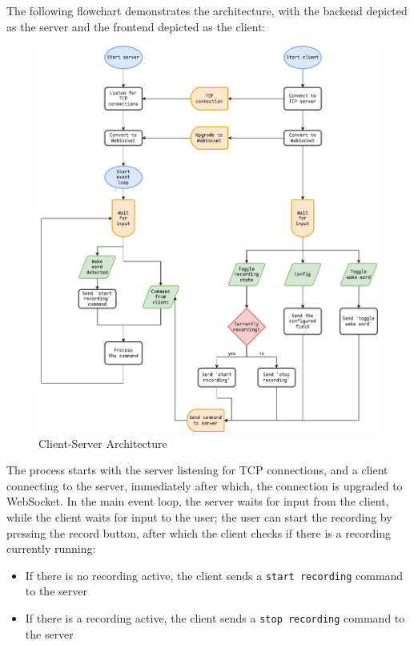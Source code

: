 The following flowchart demonstrates the architecture, with the backend depicted as the server and the frontend depicted as the client:
\begin{figure}[H]
\centering
\includegraphics[width=\textwidth]{assets/architecture}
\caption{Client-Server Architecture}
\label{chart:architecture}
\end{figure}

The process starts with the server listening for TCP connections, and a client connecting to the server, immediately after which,
the connection is upgraded to WebSocket.
In the main event loop, the server waits for input from the client, while the client waits for input to the user;
the user can start the recording by pressing the record button, after which the client checks if there is a recording currently running:

\begin{itemize}
    \item If there is no recording active, the client sends a \texttt{start recording} command to the server
    \item If there is a recording active, the client sends a \texttt{stop recording} command to the server
\end{itemize}

